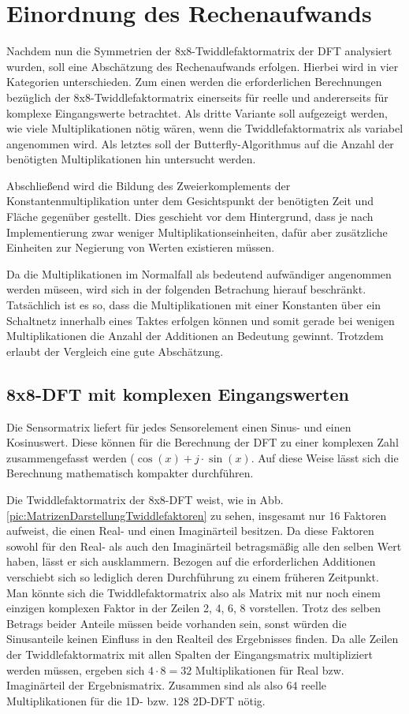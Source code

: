 \section{Einordnung des Rechenaufwands}\label{sec:abschaetzung_Rechenaufwand}
Nachdem nun die Symmetrien der 8x8-Twiddlefaktormatrix der DFT analysiert wurden, soll eine Abschätzung des Rechenaufwands erfolgen.
Hierbei wird in vier Kategorien unterschieden. Zum einen werden die erforderlichen Berechnungen bezüglich der 8x8-Twiddlefaktormatrix einerseits für reelle
und andererseits für komplexe Eingangswerte betrachtet. Als dritte Variante soll aufgezeigt werden, wie viele Multiplikationen nötig wären, wenn die 
Twiddlefaktormatrix als variabel angenommen wird. Als letztes soll der Butterfly-Algorithmus auf die Anzahl der benötigten Multiplikationen
hin untersucht werden.


Abschließend wird die Bildung des Zweierkomplements der Konstantenmultiplikation unter dem Gesichtspunkt der benötigten Zeit und Fläche gegenüber gestellt.
Dies geschieht vor dem Hintergrund, dass je nach Implementierung zwar weniger Multiplikationseinheiten, dafür aber zusätzliche Einheiten zur Negierung von Werten existieren müssen.

Da die Multiplikationen im Normalfall als bedeutend aufwändiger angenommen werden müseen, wird sich in der folgenden Betrachung hierauf beschränkt. Tatsächlich ist es so,
dass die Multiplikationen mit einer Konstanten über ein Schaltnetz innerhalb eines Taktes erfolgen können und somit gerade bei wenigen Multiplikationen die Anzahl der Additionen
an Bedeutung gewinnt. Trotzdem erlaubt der Vergleich eine gute Abschätzung.

\subsection{8x8-DFT mit komplexen Eingangswerten}\label{sec:KomplexeEingangswerte}
Die Sensormatrix liefert für jedes Sensorelement einen Sinus- und einen Kosinuswert. Diese können für die Berechnung der DFT zu einer komplexen Zahl zusammengefasst werden
($\cos(x)+j\cdot \sin(x)$. Auf diese Weise lässt sich die Berechnung mathematisch kompakter durchführen.

Die Twiddlefaktormatrix der 8x8-DFT weist, wie in Abb. \ref{pic:MatrizenDarstellungTwiddlefaktoren} zu sehen, insgesamt nur 16 Faktoren aufweist, die einen Real- und einen Imaginärteil 
besitzen. Da diese Faktoren sowohl für den Real- als auch den Imaginärteil betragsmäßig alle den selben Wert haben, lässt er sich ausklammern. Bezogen auf die erforderlichen 
Additionen verschiebt sich so lediglich deren Durchführung zu einem früheren Zeitpunkt. Man könnte sich die Twiddlefaktormatrix also als Matrix mit nur noch einem einzigen 
komplexen Faktor in der Zeilen 2, 4, 6, 8 vorstellen. Trotz des selben Betrags beider Anteile müssen beide vorhanden sein, sonst würden die Sinusanteile keinen Einfluss in
den Realteil des Ergebnisses finden. Da alle Zeilen der Twiddlefaktormatrix mit allen Spalten der Eingangsmatrix multipliziert werden müssen, ergeben sich $4\cdot8=32$ 
Multiplikationen für Real bzw. Imaginärteil der Ergebnismatrix. Zusammen sind als also $64$ reelle Multiplikationen für die 1D- bzw. $128$ 2D-DFT nötig.


